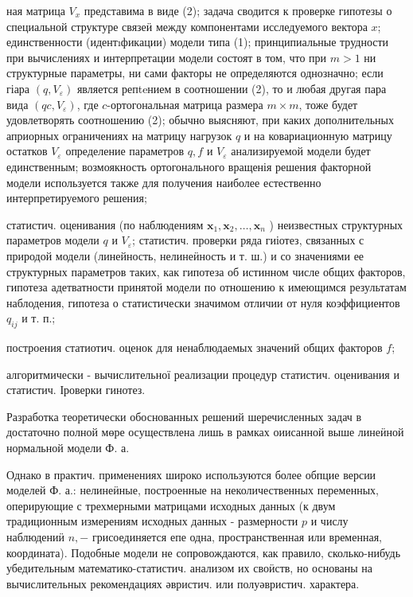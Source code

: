 \documentclass[10pt]{article}
\begin{document}
ная матрица $V_{x}$ представима в виде (2); задача сводится к проверке гипотезы о специальной структуре связеӥ между компонентами исследуемого вектора $x$; единственности (идентıфикации) модели типа (1); принципиальные трудности при вычислениях и интерпретации модели состоят в том, что при $m>1$ ни структурные параметры, ни сами факторы не определяются однозначно; если гіара $\left(q, V_{\varepsilon}\right)$ является репteнием в соотношении (2), то и любая другая пара вида $\left(q c, V_{\varepsilon}\right)$, где $c$-ортогональная матрица размера $m \times m$, тоже будет удовлетворять соотношению (2); обычно выясняют, при каких дополнительных априорных ограничениях на матрицу нагрузок $q$ и на ковариационную матрицу остатков $V_{\varepsilon}$ определение параметров $q, f$ и $V_{\mathcal{\varepsilon}}$ анализируемой модели будет единственным; возмоякность ортогонального вращенія решения факторной модели используется также для получения наиболее естественно интерпретируемого решения;



статистич. оценивания (по наблюдениям $\boldsymbol{x}_{1}, \boldsymbol{x}_{2}, \ldots, \boldsymbol{x}_{n}$ ) неизвестных структурных параметров модели $q$ и $V_{\varepsilon}$; статистич. проверки ряда гиіотез, связанных с природой модели (линейность, нелинеӥность и т. ш.) и со значениями ее структурных параметров таких, как гипотеза об истинном числе общих факторов, гипотеза адетватности принятой модели по отношению к имеющимся результатам наблодения, гипотеза о статистически значимом отличии от нуля коэффициентов $q_{i j}$ и т. п.;



построения статиотич. оценок для ненаблюдаемых значений общих факторов $f$;



алгоритмически - вычислительної реализации процедур статистич. оценивания и статистич. Іроверки гинотез.



Разработка теоретически обоснованных решений шеречисленных задач в достаточно полной мөре осуществлена лишь в рамках оиисанной выше линеӥной нормальной модели Ф. а.



Однако в практич. применениях широко используются более обпцие версии моделей Ф. а.: нелинеӥные, построенные на неколичественных переменных, оперирующие с трехмерными матрицами исходных данных (к двум традиционным измерениям исходных данных - размерности $p$ и числу наблюдениӥ $n,-$ грисоединяется епе одна, пространственная или временная, координата). Подобные модели не сопровождаются, как правило, сколько-нибудь убедительным математико-статистич. анализом их своӥств, но основаны на вычислительных рекомендациях әвристич. или полуәвристич. характера.
\end{document}
